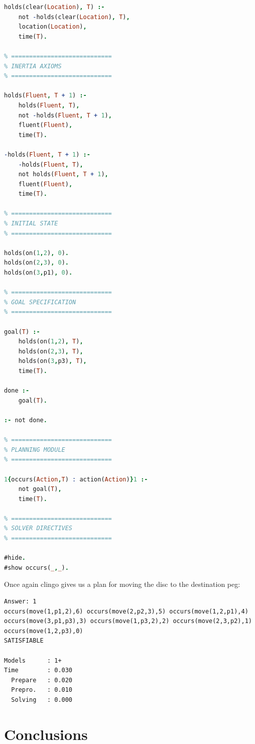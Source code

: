 \documentclass{article}
\begin{document}
\begin{lstlisting}[language=Prolog, caption=Towers of Hanoi Domain Representation in A-Prolog, label=lst:asp-hanoi]
holds(clear(Location), T) :-
    not -holds(clear(Location), T),
    location(Location),
    time(T).

% ============================
% INERTIA AXIOMS
% ============================

holds(Fluent, T + 1) :-
    holds(Fluent, T),
    not -holds(Fluent, T + 1),
    fluent(Fluent),
    time(T).

-holds(Fluent, T + 1) :-
    -holds(Fluent, T),
    not holds(Fluent, T + 1),
    fluent(Fluent),
    time(T).

% ============================
% INITIAL STATE
% ============================

holds(on(1,2), 0).
holds(on(2,3), 0).
holds(on(3,p1), 0).

% ============================
% GOAL SPECIFICATION
% ============================

goal(T) :-
    holds(on(1,2), T),
    holds(on(2,3), T),
    holds(on(3,p3), T),
    time(T).

done :-
    goal(T).

:- not done.

% ============================
% PLANNING MODULE
% ============================

1{occurs(Action,T) : action(Action)}1 :-
    not goal(T),
    time(T).

% ============================
% SOLVER DIRECTIVES
% ============================

#hide.
#show occurs(_,_).
\end{lstlisting}

\noindent Once again clingo gives us a plan for moving the disc to the destination peg:
\begin{verbatim}
Answer: 1
occurs(move(1,p1,2),6) occurs(move(2,p2,3),5) occurs(move(1,2,p1),4)
occurs(move(3,p1,p3),3) occurs(move(1,p3,2),2) occurs(move(2,3,p2),1)
occurs(move(1,2,p3),0) 
SATISFIABLE

Models      : 1+    
Time        : 0.030
  Prepare   : 0.020
  Prepro.   : 0.010
  Solving   : 0.000
\end{verbatim}

\section{Conclusions}
\end{document}
